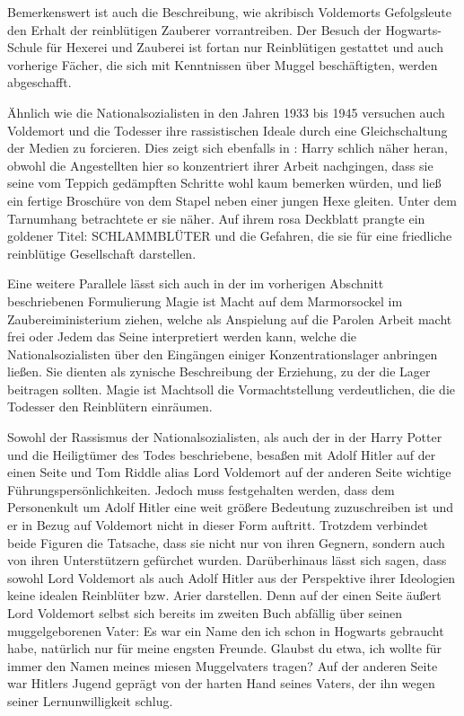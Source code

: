 Bemerkenswert ist auch die Beschreibung, wie akribisch Voldemorts Gefolgsleute den \glqq Erhalt\grqq{} der reinblütigen Zauberer vorrantreiben.
Der Besuch der Hogwarts-Schule für Hexerei und Zauberei ist fortan nur Reinblütigen gestattet und auch vorherige Fächer, die sich mit Kenntnissen über Muggel beschäftigten, werden abgeschafft. 

Ähnlich wie die Nationalsozialisten in den Jahren 1933 bis 1945 versuchen auch Voldemort und die Todesser ihre rassistischen Ideale durch eine \glqq Gleichschaltung\grqq{} der Medien zu forcieren.
Dies zeigt sich ebenfalls in \cite[S.\,256]{JKR10}: \glqq Harry schlich näher heran, obwohl die Angestellten hier so konzentriert ihrer Arbeit nachgingen, dass sie seine vom Teppich gedämpften Schritte wohl kaum bemerken würden, und ließ ein fertige Broschüre von dem Stapel neben einer jungen Hexe gleiten. Unter dem Tarnumhang betrachtete er sie näher. Auf ihrem rosa Deckblatt prangte ein goldener Titel: SCHLAMMBLÜTER und die Gefahren, die sie für eine friedliche reinblütige Gesellschaft darstellen\grqq.

Eine weitere Parallele lässt sich auch in der im vorherigen Abschnitt beschriebenen Formulierung \glqq Magie ist Macht\grqq{} auf dem Marmorsockel im Zaubereiministerium ziehen, welche als Anspielung auf die Parolen  \glqq Arbeit macht frei\grqq{} oder \glqq Jedem das Seine\grqq{} interpretiert werden kann, welche die Nationalsozialisten über den Eingängen einiger Konzentrationslager anbringen ließen.
Sie dienten als zynische Beschreibung der \glqq Erziehung\grqq, zu der die Lager beitragen sollten.
\glqq Magie ist Macht\grqq soll die Vormachtstellung verdeutlichen, die die Todesser den \glqq Reinblütern\grqq{} einräumen.

Sowohl der Rassismus der Nationalsozialisten, als auch der in der \glqq Harry Potter und die Heiligtümer des Todes\grqq{} beschriebene, besaßen mit Adolf Hitler auf der einen Seite und Tom Riddle alias Lord Voldemort auf der anderen Seite wichtige Führungspersönlichkeiten.
Jedoch muss festgehalten werden, dass dem Personenkult um Adolf Hitler eine weit größere Bedeutung zuzuschreiben ist und er in Bezug auf Voldemort nicht in dieser Form auftritt.
Trotzdem verbindet beide Figuren die Tatsache, dass sie nicht nur von ihren Gegnern, sondern auch von ihren Unterstützern gefürchet wurden\cite[S.\,15]{JKR10}. 
Darüberhinaus lässt sich sagen, dass sowohl Lord Voldemort als auch Adolf Hitler aus der Perspektive ihrer Ideologien keine \glqq idealen\grqq{} Reinblüter bzw. Arier darstellen.
Denn auf der einen Seite äußert Lord Voldemort selbst sich bereits im zweiten Buch abfällig über seinen muggelgeborenen Vater: \glqq Es war ein Name den ich schon in Hogwarts gebraucht habe, natürlich nur für meine engsten Freunde. Glaubst du etwa, ich wollte für immer den Namen meines miesen Muggelvaters tragen?\grqq{}\cite[S.\,323]{JKR98}
Auf der anderen Seite war Hitlers Jugend geprägt von der harten Hand seines Vaters, der ihn wegen seiner Lernunwilligkeit schlug.\cite[S.\,21f]{BH97} 

